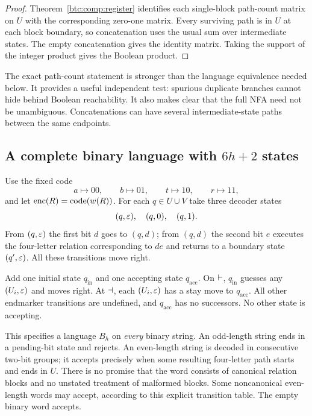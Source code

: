 \begin{proof}
Theorem~\ref{btc:comp:register} identifies each single-block path-count
matrix on $U$ with the corresponding zero-one matrix. Every
surviving path is in $U$ at each block boundary, so concatenation
uses the usual sum over intermediate states. The empty
concatenation gives the identity matrix. Taking the support of
the integer product gives the Boolean product.
\end{proof}

The exact path-count statement is stronger than the language
equivalence needed below. It provides a useful independent test:
spurious duplicate branches cannot hide behind Boolean
reachability. It also makes clear that the full NFA need not be
unambiguous. Concatenations can have several intermediate-state
paths between the same endpoints.

\subsection{A complete binary language with \texorpdfstring{$6h+2$}{6h+2} states}
\label{btc:comp:binary}

Use the fixed code
\begin{equation}\label{btc:comp:bit-code}
 a\mapsto00,\qquad b\mapsto01,\qquad
 t\mapsto10,\qquad r\mapsto11,
\end{equation}
and let $\operatorname{enc}(R)=\operatorname{code}(w(R))$.
For each $q\in U\cup V$ take three decoder states
\[
 (q,\varepsilon),\quad(q,0),\quad(q,1).
\]
From $(q,\varepsilon)$ the first bit $d$ goes to $(q,d)$; from $(q,d)$
the second bit $e$ executes the four-letter relation corresponding
to $de$ and returns to a boundary state $(q',\varepsilon)$.
All these transitions move right.

Add one initial state $q_{\mathrm{in}}$ and one accepting state
$q_{\mathrm{acc}}$. On $\vdash$, $q_{\mathrm{in}}$ guesses any
$(U_i,\varepsilon)$ and moves right. At $\dashv$, each $(U_i,\varepsilon)$
has a stay move to $q_{\mathrm{acc}}$. All other endmarker
transitions are undefined, and $q_{\mathrm{acc}}$ has no successors.
No other state is accepting.

This specifies a language $B_h$ on \emph{every} binary string.
An odd-length string ends in a pending-bit state and rejects.
An even-length string is decoded in consecutive two-bit groups;
it accepts precisely when some resulting four-letter path starts
and ends in $U$. There is no promise that the word consists of
canonical relation blocks and no unstated treatment of malformed
blocks. Some noncanonical even-length words may accept, according
to this explicit transition table. The empty binary word accepts.


